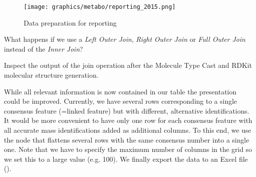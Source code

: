 \begin{figure}[htbp]
  \centering
  \texttt{[image: graphics/metabo/reporting\_2015.png]}
  \caption{Data preparation for reporting}
  \label{fig:reporting}
\end{figure}

\begin{question}
What happens if we use a \textit{Left Outer Join}, \textit{Right Outer Join} or \textit{Full Outer Join} instead of the \textit{Inner Join}?
\end{question}

\begin{task}
Inspect the output of the join operation after the Molecule Type Cast and RDKit molecular structure generation.
\end{task}

While all relevant information is now contained in our table the presentation could be improved.
Currently, we have several rows corresponding to a single consensus feature (=linked feature) but with different, alternative identifications.
It would be more convenient to have only one row for each consensus feature with all accurate mass identifications added as additional columns.
To this end, we use the  node that flattens several rows with the same consensus number into a single one.
Note that we have to specify the maximum number of columns in the grid so we set this to a large value (e.g. 100).
We finally export the data to an Excel file ().

